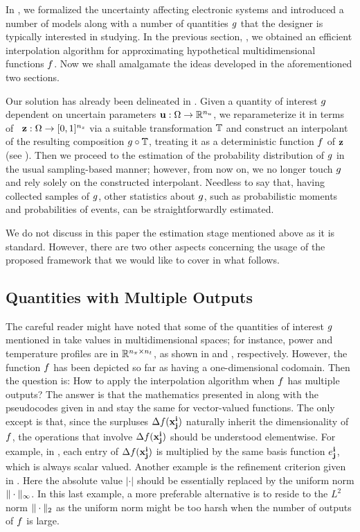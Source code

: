 In , we formalized the uncertainty affecting electronic systems
and introduced a number of models along with a number of quantities $g$ that
the designer is typically interested in studying. In the previous section,
, we obtained an efficient interpolation algorithm for
approximating hypothetical multidimensional functions $f$. Now we shall
amalgamate the ideas developed in the aforementioned two sections.

Our solution has already been delineated in . Given a quantity of
interest $g$ dependent on uncertain parameters $\mathbf{u}: \Omega \to \mathbb{R}^{n_u}$,
we reparameterize it in terms of \rvs\ $\mathbf{z}: \Omega \to [0, 1]^{n_z}$ via a
suitable transformation $\mathbb{T}$ and construct an interpolant of the
resulting composition $g \circ \mathbb{T}$, treating it as a deterministic
function $f$ of $\mathbf{z}$ (see ). Then we proceed to the
estimation of the probability distribution of $g$ in the usual sampling-based
manner; however, from now on, we no longer touch $g$ and rely solely on the
constructed interpolant. Needless to say that, having collected samples of $g$,
other statistics about $g$, such as probabilistic moments and probabilities of
events, can be straightforwardly estimated.

We do not discuss in this paper the estimation stage mentioned above as it is
standard. However, there are two other aspects concerning the usage of the
proposed framework that we would like to cover in what follows.

\subsection{Quantities with Multiple Outputs}
The careful reader might have noted that some of the quantities of interest $g$
mentioned in  take values in multidimensional spaces; for
instance, power and temperature profiles are in $\mathbb{R}^{{n_\pi} \times {n_t}}$, as
shown in  and , respectively.
However, the function $f$ has been depicted so far as having a one-dimensional
codomain. Then the question is: How to apply the interpolation algorithm when
$f$ has multiple outputs? The answer is that the mathematics presented in
 along with the pseudocodes given in  and
 stay the same for vector-valued functions. The only except is
that, since the surpluses $\Delta f(\mathbf{x}^{\mathbf{i}}_{\mathbf{j}})$ naturally inherit the
dimensionality of $f$, the operations that involve $\Delta f(\mathbf{x}^{\mathbf{i}}_{\mathbf{j}})$
should be understood elementwise. For example, in ,
each entry of $\Delta f(\mathbf{x}^{\mathbf{i}}_{\mathbf{j}})$ is multiplied by the same basis function
$e^{\mathbf{i}}_{\mathbf{j}}$, which is always scalar valued. Another example is the refinement
criterion given in . Here the absolute value $|\cdot|$ should be
essentially replaced by the uniform norm $\| \cdot \|_\infty$. In this last
example, a more preferable alternative is to reside to the $L^2$ norm
$\| \cdot \|_2$ as the uniform norm might be too harsh when the number of
outputs of $f$ is large.

